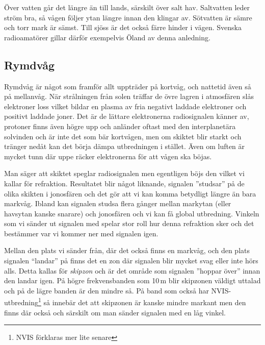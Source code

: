 Över vatten går det längre än till lands, särskilt över salt
hav. Saltvatten leder ström bra, så vågen följer ytan längre innan den
klingar av. Sötvatten är sämre och torr mark är sämst. Till sjöss är
det också färre hinder i vägen. Svenska radioamatörer gillar därför
exempelvis Öland av denna anledning.

\subsection{Rymdvåg}
\label{sec:rymdvag}

Rymdvåg är något som framför allt uppträder på kortvåg, och nattetid
även så på mellanvåg. När strålningen från solen träffar de övre
lagren i atmosfären slås elektroner loss vilket bildar en plasma av
fria negativt laddade elektroner och positivt laddade joner. Det är de
lättare elektronerna radiosignalen känner av, protoner finns även
högre upp och anländer oftast med den interplanetära solvinden och är
inte det som bär kortvågen, men om skiktet blir starkt och tränger
nedåt kan det börja dämpa utbredningen i stället. Även om luften är
mycket tunn där uppe räcker elektronerna för att vågen ska böjas.

Man säger att skiktet speglar radiosignalen men egentligen böjs den
vilket vi kallar för refraktion. Resultatet blir något liknande,
signalen ''studsar'' på de olika skikten i jonosfären och det gör att
vi kan komma betydligt längre än bara markvåg. Ibland kan signalen
studsa flera gånger mellan markytan (eller havsytan kanske snarare)
och jonosfären och vi kan få global utbredning. Vinkeln som vi sänder
ut signalen med spelar stor roll hur denna refraktion sker och det
bestämmer var vi kommer ner med signalen igen.

Mellan den plats vi sänder från, där det också finns en markvåg, och
den plats signalen ``landar'' på finns det en zon där signalen blir
mycket svag eller inte hörs alls. Detta kallas för {\it skipzon} och
är det område som signalen ''hoppar över'' innan den landar igen. På
högre frekvensbanden som 10\,m blir skipzonen väldigt uttalad och på
de lägre banden är den mindre så. På band som också har
NVIS-utbredning\footnote{NVIS förklaras mer lite senare} så innebär
det att skipzonen är kanske mindre markant men den finns där också och
särskilt om man sänder signalen med en låg vinkel.

